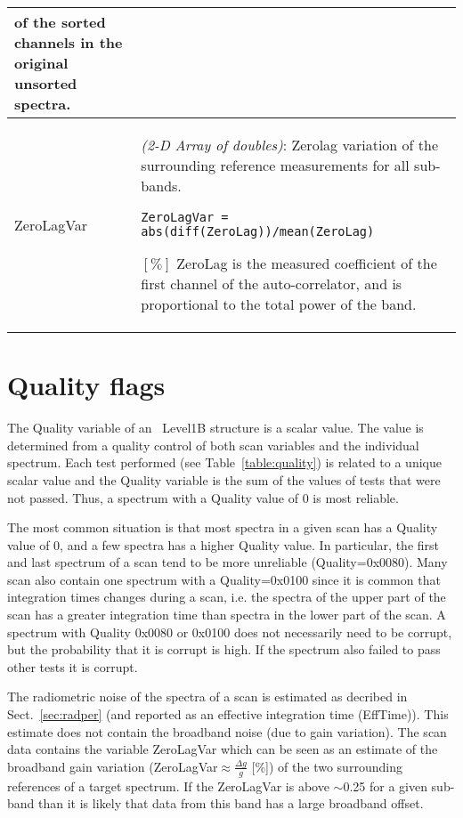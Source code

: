 \begin{longtable}{| p{} | p{} |}
                       of the sorted channels in the original unsorted spectra. \\ \hline 
     ZeroLagVar      & \emph{(2-D Array of doubles)}: Zerolag variation of the surrounding reference measurements for all sub-bands.
                       \begin{verbatim}ZeroLagVar = abs(diff(ZeroLag))/mean(ZeroLag)\end{verbatim} \([\%]\)
                        ZeroLag is the measured coefficient of the first channel of the auto-correlator,
                        and is proportional to the total power of the band. \\ \hline
\hline
\end{longtable}


\section{Quality flags}

The Quality variable of an \smr\ Level1B structure is a scalar value.
The value is determined from a quality control
of both scan variables and the individual spectrum.
Each test performed (see Table~\ref{table:quality}) is related to a unique scalar value
and the Quality variable is the sum of the values of tests 
that were not passed.  
Thus, a spectrum with a Quality value of 0 is most reliable.

The most common situation is that most spectra in a given scan has 
a Quality value of 0, and a few spectra has a higher Quality value.
In particular, the first and last spectrum of a scan tend to be more
unreliable (Quality=0x0080).  
Many scan also contain one spectrum with a Quality=0x0100
since it is common that integration times changes during a scan,
i.e. the spectra of the upper part of the scan has a greater integration 
time than spectra in the lower part of the scan.
A spectrum with Quality 0x0080 or 0x0100 does not necessarily need
to be corrupt, but the probability that it is corrupt is high.  
If the spectrum also failed to pass other tests it is corrupt. 

The radiometric noise of the spectra of a scan is estimated as decribed  
in Sect.~\ref{sec:radper} (and reported as an effective integration time (EffTime)).
This estimate does not contain the broadband noise (due to gain variation). 
The scan data contains the variable ZeroLagVar which can be seen as an estimate
of the broadband gain variation (ZeroLagVar\(\approx \frac{\Delta g}{g}\) [\%]) 
of the two surrounding references of a target spectrum.
If the ZeroLagVar is above \(\sim\)0.25 for a given sub-band
than it is likely that data from this band has a large broadband offset.
  

